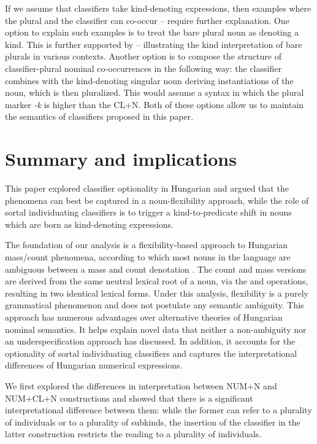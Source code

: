 \documentclass[output=paper]{langscibook}
\begin{document}
\noindent If we assume that classifiers take kind-denoting expressions, then examples where the plural and the classifier can co-occur -- require further explanation. One option to explain such examples is to treat the bare plural noun as denoting a kind. This is further supported by -- illustrating the kind interpretation of bare plurals in various contexts. Another option is to compose the structure of classifier-plural nominal co-occurrences in the following way: the classifier combines with the kind-denoting singular noun deriving instantiations of the noun, which is then pluralized. This would assume a syntax in which the plural marker \textit{-k} is higher than the CL+N. Both of these options allow us to maintain the semantics of classifiers proposed in this paper.  

\section{Summary and implications} \label{schv-nem:sec:6}

This paper explored classifier optionality in Hungarian and argued that the phenomena can best be captured in a noun-flexibility approach, while the role of sortal individuating classifiers is to trigger a kind-to-predicate shift in nouns which are born as kind-denoting expressions.  

The foundation of our analysis is a flexibility-based approach to Hungarian mass/count phenomena, according to which most nouns in the language are ambiguous between a mass and count denotation \citep{schvarcz-rothstein-17}. The count and mass versions are derived from the same neutral lexical root of a noun, via the  and  operations, resulting in  two identical lexical forms. Under this analysis, flexibility is a purely grammatical phenomenon and does not postulate any semantic ambiguity. This approach has numerous advantages over alternative theories of Hungarian nominal semantics. It  helps explain novel data that neither a non-ambiguity \citep{dekany-11, csirmaz-dekany-14} nor an underspecification \citep{erbach-etal-19} approach has discussed. In addition, it accounts for the optionality of sortal individuating classifiers and captures the interpretational differences of Hungarian numerical expressions. 

We first explored the differences in interpretation between NUM+N and \linebreak NUM+CL+N constructions and showed that there is a significant interpretational difference between them: while the former can refer to a plurality of individuals or to a plurality of subkinds, the insertion of the classifier in the latter construction restricts the reading to a plurality of individuals. 
\end{document}
